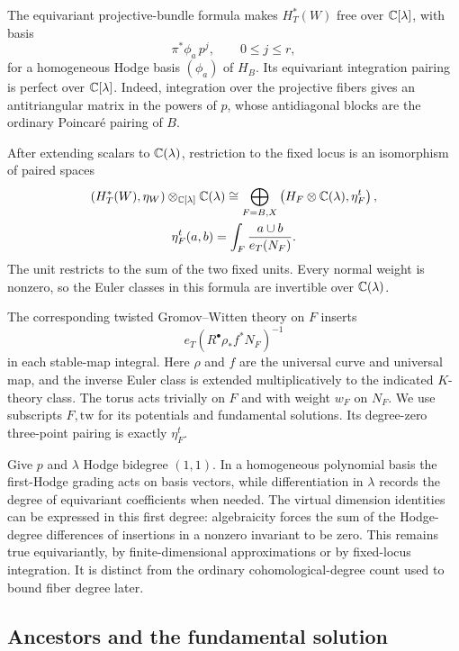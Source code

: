 The equivariant projective-bundle formula makes $H_T^*(W)$ free over
$\mathbb C[\lambda]$, with basis
\[
                    \pi^*\phi_a\,p^j,\qquad 0\leq j\leq r,
\]
for a homogeneous Hodge basis $(\phi_a)$ of $H_B$.
Its equivariant integration pairing is perfect over $\mathbb C[\lambda]$.
Indeed, integration over the projective fibers gives an antitriangular
matrix in the powers of $p$, whose antidiagonal blocks are the ordinary
Poincar\'e pairing of $B$.

After extending scalars to $\mathbb C(\lambda)$, restriction to the fixed locus
is an isomorphism of paired spaces
\begin{equation}
\begin{gathered}
 \left(H_T^*(W),\eta_W\right)\otimes_{\mathbb C[\lambda]}\mathbb C(\lambda)
   \cong
 \bigoplus_{F=B,X}\left(H_F\otimes\mathbb C(\lambda),\eta_F^t\right),\\
 \eta_F^t(a,b)=\int_F\frac{a\cup b}{e_T(N_F)}.
\end{gathered}
 \label{geo:fixed-pairing}
\end{equation}
The unit restricts to the sum of the two fixed units.  Every normal weight
is nonzero, so the Euler classes in this formula are invertible over
$\mathbb C(\lambda)$.

The corresponding twisted Gromov--Witten theory on $F$ inserts
\begin{equation}
    e_T\!\left(R^\bullet\rho_*f^*N_F\right)^{-1}
    \label{geo:Euler-twist}
\end{equation}
in each stable-map integral.  Here $\rho$ and $f$ are the universal curve
and universal map, and the inverse Euler class is extended
multiplicatively to the indicated $K$-theory class.  The torus acts
trivially on $F$ and with weight $w_F$ on $N_F$.
We use subscripts $F,\mathrm{tw}$ for its potentials and fundamental
solutions.  Its degree-zero three-point pairing is exactly $\eta_F^t$.

Give $p$ and $\lambda$ Hodge bidegree $(1,1)$.  In a homogeneous polynomial
basis the first-Hodge grading acts on basis vectors, while differentiation
in $\lambda$ records the degree of equivariant coefficients when needed.
The virtual dimension identities can be expressed in this first degree:
algebraicity forces the sum of the Hodge-degree differences of insertions
in a nonzero invariant to be zero.  This remains true equivariantly, by
finite-dimensional approximations or by fixed-locus integration.
It is distinct from the ordinary cohomological-degree count used to bound
fiber degree later.

\subsection{Ancestors and the fundamental solution}\label{geo:ancestors}


